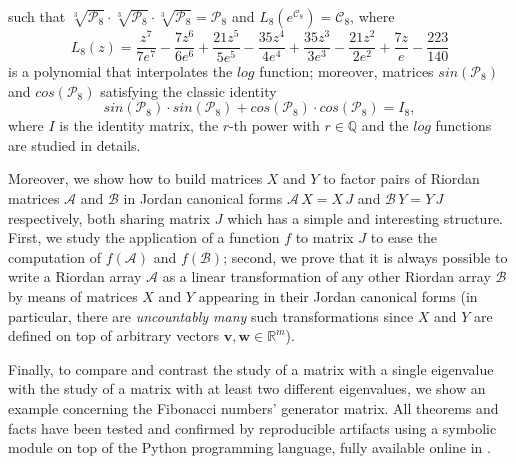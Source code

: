 such that %
$\sqrt[3]{\mathcal{P}_8} \cdot \sqrt[3]{\mathcal{P}_8} \cdot
\sqrt[3]{\mathcal{P}_8} =\mathcal{P}_8$ and
$L_{8}\left({e^{\mathcal{C}_{8}}}\right) = \mathcal{C}_{8}$, where
\begin{displaymath}
{L_{ 8 }}{\left (z \right )} = \frac{z^{7}}{7 e^{7}} - \frac{7 z^{6}}{6 e^{6}} + \frac{21 z^{5}}{5 e^{5}} - \frac{35 z^{4}}{4 e^{4}} + \frac{35 z^{3}}{3 e^{3}} - \frac{21 z^{2}}{2 e^{2}} + \frac{7 z}{e} - \frac{223}{140}
\end{displaymath}
is a polynomial that interpolates the $log$ function; moreover, matrices
$sin(\mathcal{P}_8)$ and $cos(\mathcal{P}_8)$ satisfying the classic identity
\begin{equation}
sin(\mathcal{P}_8)\cdot sin(\mathcal{P}_8)+ cos(\mathcal{P}_8)\cdot
cos(\mathcal{P}_8)=I_{8},
\label{eq:matrices:functions:sin:cos:identity}
\end{equation}
where $I$ is the identity matrix, the $r$-th power
with $r\in\mathbb{Q}$ and the $log$ functions are studied in details.

Moreover, we show how to build matrices $X$ and $Y$ to factor pairs of Riordan
matrices $\mathcal{A}$ and $\mathcal{B}$ in  Jordan canonical forms
$\mathcal{A}\,X=X\,J$ and $\mathcal{B}\,Y=Y\,J$ respectively, both sharing
matrix $J$ which has a simple and interesting structure. First, we study the
application of a function $f$ to matrix $J$  to ease the computation of
$f(\mathcal{A})$ and $f(\mathcal{B})$; second, we prove that it is always
possible to write a Riordan array $\mathcal{A}$ as a linear transformation of
any other Riordan array $\mathcal{B}$ by means of matrices $X$ and $Y$
appearing in their Jordan canonical forms (in particular, there are
\textit{uncountably many} such transformations since $X$ and $Y$ are defined on
top of arbitrary vectors $\boldsymbol{v},\boldsymbol{w}\in\mathbb{R}^{m}$).

Finally, to compare and contrast the study of a matrix with a single eigenvalue
with the study of a matrix with at least two different eigenvalues, we show an
example concerning the Fibonacci numbers' generator matrix.  All theorems and
facts have been tested and confirmed by reproducible artifacts using a symbolic
module on top of the Python programming language, fully available online in
\citep{MN:simulation:method:repo}.


